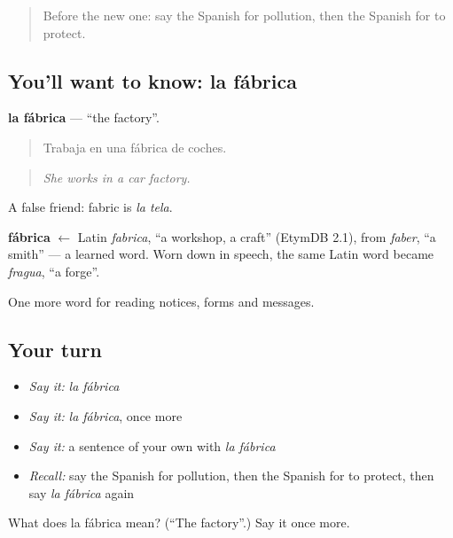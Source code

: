 \begin{quote}
Before the new one: say the Spanish for pollution, then the Spanish for to protect.
\end{quote}

\subsection*{You'll want to know: la fábrica}
\textbf{la fábrica} — \textquotedblleft{}the factory\textquotedblright{}.

\begin{quote}
Trabaja en una fábrica de coches.
\end{quote}

\begin{quote}
\emph{She works in a car factory.}
\end{quote}

A false friend: fabric is \emph{la tela}.

\begin{cousinweb}
\textbf{fábrica} $\leftarrow$ Latin \emph{fabrica}, \textquotedblleft{}a workshop, a craft\textquotedblright{} (EtymDB 2.1), from \emph{faber}, \textquotedblleft{}a smith\textquotedblright{} — a learned word. Worn down in speech, the same Latin word became \emph{fragua}, \textquotedblleft{}a forge\textquotedblright{}.
\end{cousinweb}

\begin{grammarlens}[title={What you've built}]
One more word for reading notices, forms and messages.
\end{grammarlens}

\subsection*{Your turn}
\begin{itemize}
\raggedright
  \item \emph{Say it:} \emph{la fábrica}
  \item \emph{Say it:} \emph{la fábrica}, once more
  \item \emph{Say it:} a sentence of your own with \emph{la fábrica}
  \item \emph{Recall:} say the Spanish for pollution, then the Spanish for to protect, then say \emph{la fábrica} again
\end{itemize}

\begin{tcolorbox}[breakable,colback=teal!4,colframe=teal!35!black,title={Before you move on}]
What does la fábrica mean? (\textquotedblleft{}The factory\textquotedblright{}.) Say it once more.
\end{tcolorbox}
